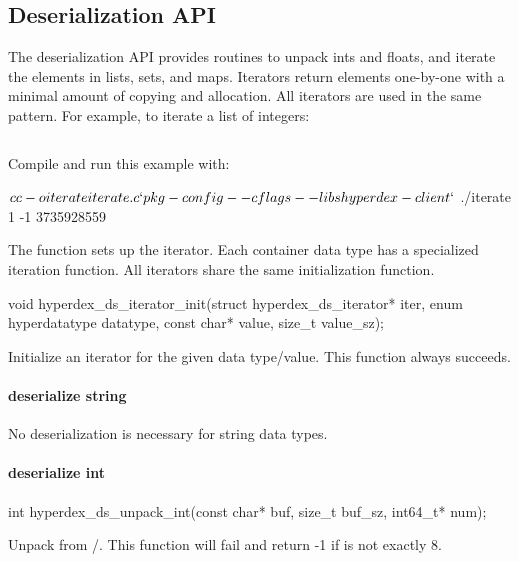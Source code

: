 \subsection{Deserialization API}
\label{sec:api:c:client:deserialize}

The deserialization API provides routines to unpack ints and floats, and iterate
the elements in lists, sets, and maps.  Iterators return elements one-by-one
with a minimal amount of copying and allocation.  All iterators are used in the
same pattern.  For example, to iterate a list of integers:

\inputminted{c}{\topdir/c/client/iterate.c}

Compile and run this example with:

\begin{consolecode}
$ cc -o iterate iterate.c `pkg-config --cflags --libs hyperdex-client`
$ ./iterate
1
-1
3735928559
\end{consolecode}

The function  sets up the iterator.  Each
container data type has a specialized iteration function.  All iterators share
the same initialization function.

\begin{ccode}
void hyperdex_ds_iterator_init(struct hyperdex_ds_iterator* iter,
                               enum hyperdatatype datatype,
                               const char* value,
                               size_t value_sz);
\end{ccode}
Initialize an iterator for the given data type/value.  This function
always succeeds.

\paragraph{deserialize string}

No deserialization is necessary for string data types.

\paragraph{deserialize int}

\begin{ccode}
int hyperdex_ds_unpack_int(const char* buf, size_t buf_sz, int64_t* num);
\end{ccode}
Unpack  from /.  This function will
fail and return -1 if  is not exactly \unit{8}{\byte}.

